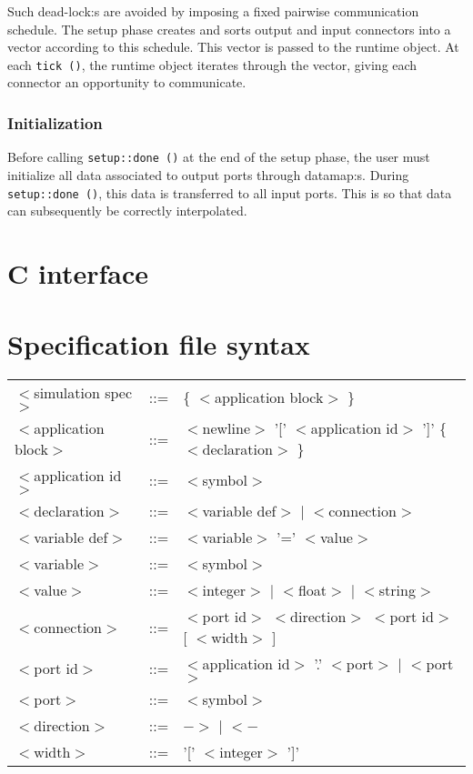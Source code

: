\documentclass[a4paper]{report}
\begin{document}
Such dead-lock:s are avoided by imposing a fixed pairwise
communication schedule.  The setup phase creates and sorts output and
input connectors into a vector according to this schedule.  This
vector is passed to the runtime object.  At each \lstinline|tick ()|, the
runtime object iterates through the vector, giving each connector an
opportunity to communicate.

\subsection{Initialization}

Before calling \lstinline|setup::done ()| at the end of the setup phase,
the user must initialize all data associated to output ports through
datamap:s.  During \lstinline|setup::done ()|, this data is transferred to
all input ports.  This is so that data can subsequently be correctly
interpolated.

\appendix

\chapter{C interface}

\chapter{Specification file syntax}

\newcommand{\nt}[1]{$<$#1$>$}

\begin{tabular}{lcl}
\nt{simulation spec}   & ::= & \{ \nt{application block} \} \\
\nt{application block} & ::= & \nt{newline} '[' \nt{application id} ']' \{ \nt{declaration}
\} \\
\nt{application id}    & ::= & \nt{symbol} \\
\nt{declaration}       & ::= & \nt{variable def} $|$ \nt{connection} \\
\nt{variable def}      & ::= & \nt{variable} '=' \nt{value} \\
\nt{variable}	       & ::= & \nt{symbol} \\
\nt{value} 	       & ::= & \nt{integer} $|$ \nt{float} $|$ \nt{string} \\
\nt{connection}	       & ::= & \nt{port id} \nt{direction} \nt{port id} [ \nt{width} ] \\
\nt{port id}	       & ::= & \nt{application id} '.' \nt{port} $|$
\nt{port} \\
\nt{port}	       & ::= & \nt{symbol} \\
\nt{direction}	       & ::= & $->$ $|$ $<-$ \\
\nt{width}	       & ::= & '[' \nt{integer} ']' \\
\end{tabular}

\printindex
\end{document}
